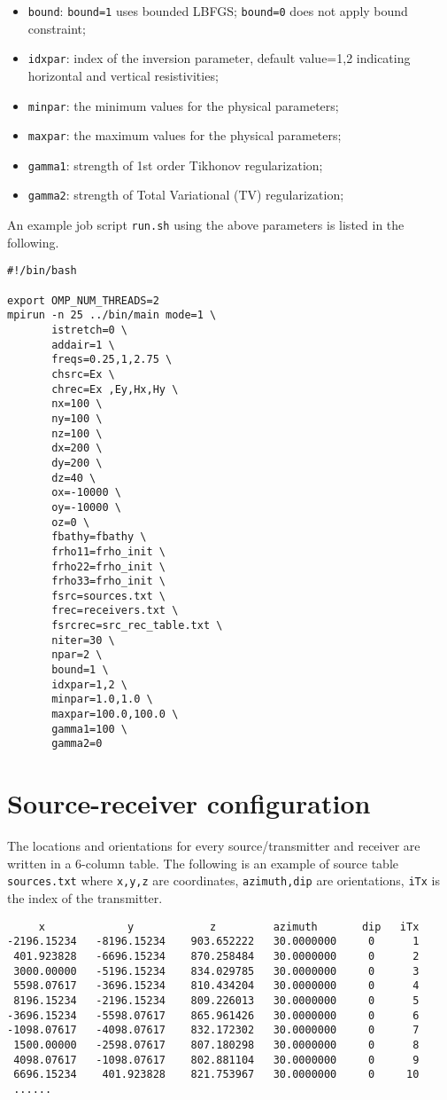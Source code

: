 \documentclass[a4paper,10pt]{article}
\begin{document}
\begin{itemize}
\item \verb|bound|: \texttt{bound=1} uses bounded LBFGS; \texttt{bound=0} does not apply bound constraint;
\item \verb|idxpar|: index of the inversion parameter, default value=1,2 indicating horizontal and vertical resistivities;
\item \verb|minpar|: the minimum values for the physical parameters;
\item \verb|maxpar|: the maximum values for the physical parameters;
\item \verb|gamma1|: strength of 1st order Tikhonov regularization;
\item \verb|gamma2|: strength of Total Variational (TV) regularization;
\end{itemize}
An example job script \verb|run.sh| using the above parameters is listed in the following.

\begin{verbatim}
#!/bin/bash

export OMP_NUM_THREADS=2
mpirun -n 25 ../bin/main mode=1 \
       istretch=0 \
       addair=1 \
       freqs=0.25,1,2.75 \
       chsrc=Ex \
       chrec=Ex ,Ey,Hx,Hy \
       nx=100 \
       ny=100 \
       nz=100 \
       dx=200 \
       dy=200 \
       dz=40 \
       ox=-10000 \
       oy=-10000 \
       oz=0 \
       fbathy=fbathy \
       frho11=frho_init \
       frho22=frho_init \
       frho33=frho_init \
       fsrc=sources.txt \
       frec=receivers.txt \
       fsrcrec=src_rec_table.txt \
       niter=30 \
       npar=2 \
       bound=1 \
       idxpar=1,2 \
       minpar=1.0,1.0 \
       maxpar=100.0,100.0 \
       gamma1=100 \
       gamma2=0
\end{verbatim}

\section{Source-receiver configuration}
The locations and orientations for every source/transmitter and receiver are written in a 6-column table. The following is an example of source table \texttt{sources.txt} where \texttt{x,y,z} are coordinates, \texttt{azimuth,dip} are orientations, \texttt{iTx} is the index of the transmitter.
\begin{verbatim}
     x             y            z         azimuth       dip   iTx
-2196.15234   -8196.15234    903.652222   30.0000000     0      1
 401.923828   -6696.15234    870.258484   30.0000000     0      2
 3000.00000   -5196.15234    834.029785   30.0000000     0      3
 5598.07617   -3696.15234    810.434204   30.0000000     0      4
 8196.15234   -2196.15234    809.226013   30.0000000     0      5
-3696.15234   -5598.07617    865.961426   30.0000000     0      6
-1098.07617   -4098.07617    832.172302   30.0000000     0      7
 1500.00000   -2598.07617    807.180298   30.0000000     0      8
 4098.07617   -1098.07617    802.881104   30.0000000     0      9
 6696.15234    401.923828    821.753967   30.0000000     0     10
 ......
\end{verbatim}
\end{document}
